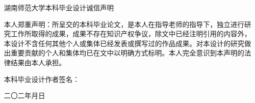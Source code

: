 \begin{center}
\heiti{}湖南师范大学本科毕业设计诚信声明
\end{center}
\vspace{1cm}

\fangsong{}本人郑重声明：所呈交的本科毕业论文，是本人在指导老师的指导下，独立进行研究工作所取得的成果，成果不存在知识产权争议，除文中已经注明引用的内容外，本设计不含任何其他个人或集体已经发表或撰写过的作品成果。对本设计的研究做出重要贡献的个人和集体均已在文中以明确方式标明。本人完全意识到本声明的法律结果由本人承担。\vspace{9cm}


\begin{flushright}
本科毕业设计作者签名：\qquad\qquad\qquad\vspace{0.25cm}

二〇二\quad 年\quad 月\quad 日\quad\qquad
\end{flushright}

